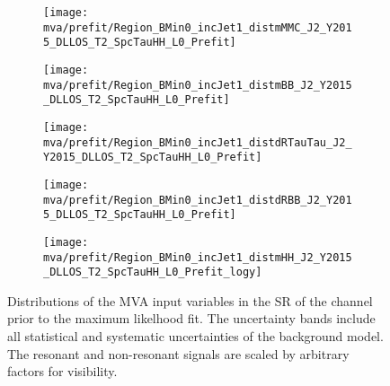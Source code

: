 \begin{figure}[htbp]
  \centering

  \begin{subfigure}[t]{.48\textwidth}
    \texttt{[image: mva/prefit/Region\_BMin0\_incJet1\_distmMMC\_J2\_Y2015\_DLLOS\_T2\_SpcTauHH\_L0\_Prefit]}
  \end{subfigure}\hfill %
  \begin{subfigure}[t]{.48\textwidth}
    \texttt{[image: mva/prefit/Region\_BMin0\_incJet1\_distmBB\_J2\_Y2015\_DLLOS\_T2\_SpcTauHH\_L0\_Prefit]}
  \end{subfigure}

  \begin{subfigure}[t]{.48\textwidth}
    \texttt{[image: mva/prefit/Region\_BMin0\_incJet1\_distdRTauTau\_J2\_Y2015\_DLLOS\_T2\_SpcTauHH\_L0\_Prefit]}
  \end{subfigure}\hfill %
  \begin{subfigure}[t]{.48\textwidth}
    \texttt{[image: mva/prefit/Region\_BMin0\_incJet1\_distdRBB\_J2\_Y2015\_DLLOS\_T2\_SpcTauHH\_L0\_Prefit]}
  \end{subfigure}

  \begin{subfigure}[t]{.48\textwidth}
    \texttt{[image: mva/prefit/Region\_BMin0\_incJet1\_distmHH\_J2\_Y2015\_DLLOS\_T2\_SpcTauHH\_L0\_Prefit\_logy]}
  \end{subfigure}

  \caption{Distributions of the MVA input variables in the SR of the
    \hadhad channel prior to the maximum likelhood fit. The
    uncertainty bands include all statistical and systematic
    uncertainties of the background model. The resonant and
    non-resonant \HH signals are scaled by arbitrary factors for
    visibility.}
  \label{fig:mva_inputs}
\end{figure}


